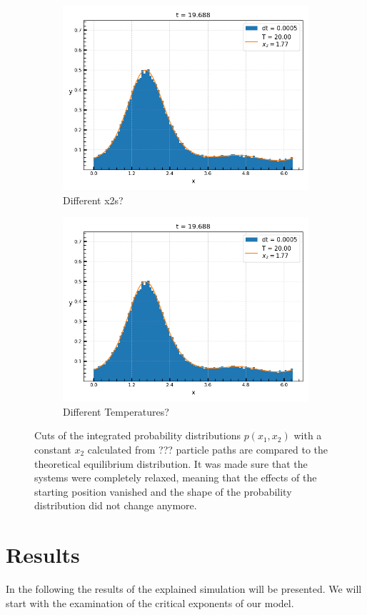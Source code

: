 	\begin{figure}[htp]
		\begin{subfigure}{0.5\textwidth}
			\centering
			\includegraphics[width=0.8\linewidth]{graphics/Pair-Equil-Dist-20.png}
			\caption{Different x2s?}
		\end{subfigure}
		\begin{subfigure}{0.5\textwidth}
			\centering
			\includegraphics[width=0.8\linewidth]{graphics/Pair-Equil-Dist-20.png}
			\caption{Different Temperatures?}
		\end{subfigure}
		\caption{Cuts of the integrated probability distributions $p(x_1, x_2)$ with a constant $x_2$ calculated from ??? particle paths are compared to the theoretical equilibrium distribution. It was made sure that the systems were completely relaxed, meaning that the effects of the starting position vanished and the shape of the probability distribution did not change anymore.}
		\label{Fig::Pair-Prob-Dist}
	\end{figure}
	
	\section{Results}
	In the following the results of the explained simulation will be presented. We will start with the examination of the critical exponents of our model. \\
	
